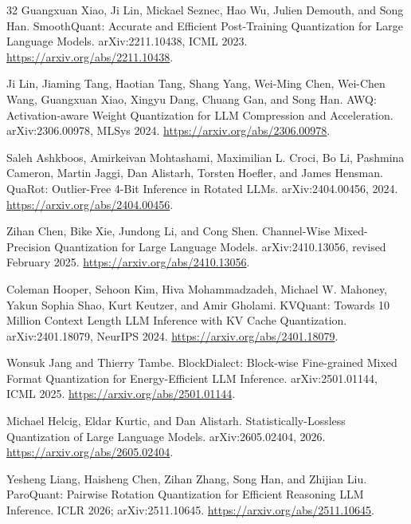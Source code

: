 \documentclass{article}
\begin{document}
\begin{thebibliography}{32}
Guangxuan Xiao, Ji Lin, Mickael Seznec, Hao Wu, Julien Demouth, and Song Han.
\newblock SmoothQuant: Accurate and Efficient Post-Training Quantization for
Large Language Models.
\newblock arXiv:2211.10438, ICML 2023.
\newblock \url{https://arxiv.org/abs/2211.10438}.

Ji Lin, Jiaming Tang, Haotian Tang, Shang Yang, Wei-Ming Chen, Wei-Chen Wang,
Guangxuan Xiao, Xingyu Dang, Chuang Gan, and Song Han.
\newblock AWQ: Activation-aware Weight Quantization for LLM Compression and
Acceleration.
\newblock arXiv:2306.00978, MLSys 2024.
\newblock \url{https://arxiv.org/abs/2306.00978}.

Saleh Ashkboos, Amirkeivan Mohtashami, Maximilian L. Croci, Bo Li, Pashmina
Cameron, Martin Jaggi, Dan Alistarh, Torsten Hoefler, and James Hensman.
\newblock QuaRot: Outlier-Free 4-Bit Inference in Rotated LLMs.
\newblock arXiv:2404.00456, 2024.
\newblock \url{https://arxiv.org/abs/2404.00456}.

Zihan Chen, Bike Xie, Jundong Li, and Cong Shen.
\newblock Channel-Wise Mixed-Precision Quantization for Large Language Models.
\newblock arXiv:2410.13056, revised February 2025.
\newblock \url{https://arxiv.org/abs/2410.13056}.

Coleman Hooper, Sehoon Kim, Hiva Mohammadzadeh, Michael W. Mahoney, Yakun
Sophia Shao, Kurt Keutzer, and Amir Gholami.
\newblock KVQuant: Towards 10 Million Context Length LLM Inference with KV
Cache Quantization.
\newblock arXiv:2401.18079, NeurIPS 2024.
\newblock \url{https://arxiv.org/abs/2401.18079}.

Wonsuk Jang and Thierry Tambe.
\newblock BlockDialect: Block-wise Fine-grained Mixed Format Quantization for
Energy-Efficient LLM Inference.
\newblock arXiv:2501.01144, ICML 2025.
\newblock \url{https://arxiv.org/abs/2501.01144}.

Michael Helcig, Eldar Kurtic, and Dan Alistarh.
\newblock Statistically-Lossless Quantization of Large Language Models.
\newblock arXiv:2605.02404, 2026.
\newblock \url{https://arxiv.org/abs/2605.02404}.

Yesheng Liang, Haisheng Chen, Zihan Zhang, Song Han, and Zhijian Liu.
\newblock ParoQuant: Pairwise Rotation Quantization for Efficient Reasoning
LLM Inference.
\newblock ICLR 2026; arXiv:2511.10645.
\newblock \url{https://arxiv.org/abs/2511.10645}.


\end{thebibliography}
\end{document}
